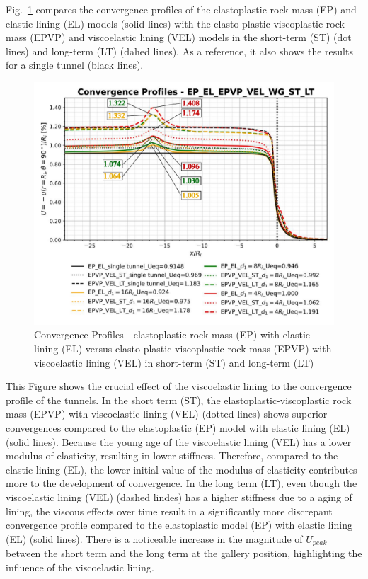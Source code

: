 \documentclass[a4paper,fleqn]{cas-sc}
\begin{document}
Fig.~\ref{EP-EL-EPVP-VEL-WG-ST-LT} compares the convergence profiles of the elastoplastic rock mass (EP) and elastic lining (EL) models (solid lines) with the elasto-plastic-viscoplastic rock mass (EPVP) and viscoelastic lining (VEL) models in the short-term (ST) (dot lines) and long-term (LT) (dahed lines). As a reference, it also shows the results for a single tunnel (black lines).

\begin{figure}[h!]
	\centering
	\includegraphics[scale=0.6]{Convergence Profiles - EP_EL_EPVP_VEL_WG_ST_LT.pdf}
	\caption{Convergence Profiles - elastoplastic rock mass (EP) with elastic lining (EL) versus elasto-plastic-viscoplastic rock mass (EPVP) with viscoelastic lining (VEL) in short-term (ST) and long-term (LT)}
	\label{EP-EL-EPVP-VEL-WG-ST-LT}
\end{figure}
\FloatBarrier

This Figure shows the crucial effect of the viscoelastic lining to the convergence profile of the tunnels. In the short term (ST), the elastoplastic-viscoplastic rock mass (EPVP) with viscoelastic lining (VEL) (dotted lines) shows superior convergences compared to the elastoplastic (EP) model with elastic lining (EL) (solid lines). Because the young age of the viscoelastic lining (VEL) has a lower modulus of elasticity, resulting in lower stiffness. Therefore, compared to the elastic lining (EL), the lower initial value of the modulus of elasticity contributes more to the development of convergence. In the long term (LT), even though the viscoelastic lining (VEL) (dashed lindes) has a higher stiffness due to a aging of lining, the viscous effects over time result in a significantly more discrepant convergence profile compared to the elastoplastic model (EP) with elastic lining (EL) (solid lines). There is a noticeable increase in the magnitude of $U_{peak}$ between the short term and the long term at the gallery position, highlighting the influence of the viscoelastic lining.
\end{document}
